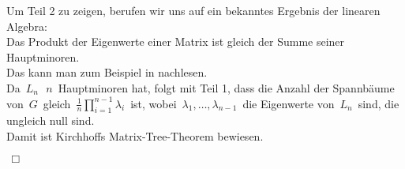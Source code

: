 Um Teil 2 zu zeigen, berufen wir uns auf ein bekanntes Ergebnis der linearen Algebra:\\
Das Produkt der Eigenwerte einer Matrix ist gleich der Summe seiner Hauptminoren.\\
Das kann man zum Beispiel in \cite{meyer_2005} nachlesen. \\
Da $\,L_n\,$ $\,n\,$ Hauptminoren hat, folgt mit Teil 1, dass die Anzahl der Spannbäume von $\,G\,$ gleich $\,\frac{1}{n}\prod_{i=1}^{n-1}\lambda_i\,$ ist, wobei $\,\lambda_1,\ldots,\lambda_{n-1}\,$ die Eigenwerte von $\,L_n\,$ sind, die ungleich null sind. \\
Damit ist Kirchhoffs Matrix-Tree-Theorem bewiesen.
\begin{flushright} $\,\Box\,$ \end{flushright} 
 

